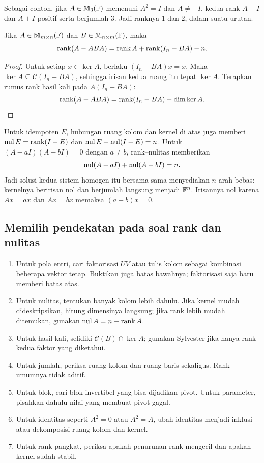 Sebagai contoh, jika $A\in\mathbb{M}_3(\mathbb{F})$ memenuhi $A^2=I$ dan
$A\ne\pm I$, kedua rank $A-I$ dan $A+I$ positif serta berjumlah $3$.
Jadi ranknya $1$ dan $2$, dalam suatu urutan.

\begin{prop}
    \label{rank:aba}
    Jika $A\in\mathbb{M}_{m\times n}(\mathbb{F})$ dan
    $B\in\mathbb{M}_{n\times m}(\mathbb{F})$, maka
    \[
        \operatorname{rank}(A-ABA)=\operatorname{rank} A+\operatorname{rank}(I_n-BA)-n.
    \]
\end{prop}
\begin{proof}
    Untuk setiap $x\in\ker A$, berlaku $(I_n-BA)x=x$.
    Maka $\ker A\subseteq\mathcal C(I_n-BA)$, sehingga irisan kedua
    ruang itu tepat $\ker A$. Terapkan rumus rank hasil kali pada
    $A(I_n-BA)$:
    \[
        \operatorname{rank}(A-ABA)=\operatorname{rank}(I_n-BA)-\dim\ker A.
    \]
\end{proof}

Untuk idempoten $E$, hubungan ruang kolom dan kernel di atas juga memberi
$\operatorname{nul} E=\operatorname{rank}(I-E)$ dan $\operatorname{nul} E+\operatorname{nul}(I-E)=n$.
Untuk $(A-aI)(A-bI)=0$ dengan $a\ne b$, rank--nulitas memberikan
\[
    \operatorname{nul}(A-aI)+\operatorname{nul}(A-bI)=n.
\]
Jadi solusi kedua sistem homogen itu bersama-sama menyediakan $n$
arah bebas: kernelnya beririsan nol dan berjumlah langsung menjadi $\mathbb{F}^n$.
Irisannya nol karena $Ax=ax$ dan $Ax=bx$ memaksa $(a-b)x=0$.

\subsection{Memilih pendekatan pada soal rank dan nulitas}

\begin{enumerate}[label=\arabic*.,leftmargin=*,itemsep=3pt]
    \item Untuk pola entri, cari faktorisasi $UV$ atau tulis kolom
        sebagai kombinasi beberapa vektor tetap. Buktikan juga batas
        bawahnya; faktorisasi saja baru memberi batas atas.
    \item Untuk nulitas, tentukan banyak kolom lebih dahulu. Jika kernel
        mudah dideskripsikan, hitung dimensinya langsung; jika rank lebih
        mudah ditemukan, gunakan $\operatorname{nul} A=n-\operatorname{rank} A$.
    \item Untuk hasil kali, selidiki $\mathcal C(B)\cap\ker A$;
        gunakan Sylvester jika hanya rank kedua faktor yang diketahui.
    \item Untuk jumlah, periksa ruang kolom dan ruang baris sekaligus.
        Rank umumnya tidak aditif.
    \item Untuk blok, cari blok invertibel yang bisa dijadikan pivot.
        Untuk parameter, pisahkan dahulu nilai yang membuat pivot gagal.
    \item Untuk identitas seperti $A^2=0$ atau $A^2=A$, ubah identitas
        menjadi inklusi atau dekomposisi ruang kolom dan kernel.
    \item Untuk rank pangkat, periksa apakah penurunan rank mengecil
        dan apakah kernel sudah stabil.
\end{enumerate}

